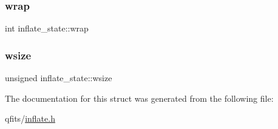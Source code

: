 \mbox{\label{structinflate__state_a990d157b5c0d4ba178c3361de9ce6561}} 
\subsubsection{\texorpdfstring{wrap}{wrap}}
{\footnotesize\ttfamily int inflate\+\_\+state\+::wrap}

\mbox{\label{structinflate__state_acca16ca86216760eaf307bf71e15e470}} 
\subsubsection{\texorpdfstring{wsize}{wsize}}
{\footnotesize\ttfamily unsigned inflate\+\_\+state\+::wsize}



The documentation for this struct was generated from the following file\+:\begin{DoxyCompactItemize}
\item 
qfits/\hyperlink{inflate_8h}{inflate.\+h}\end{DoxyCompactItemize}
